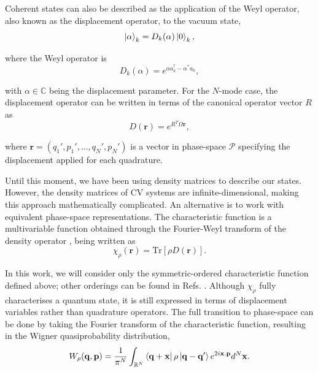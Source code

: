 \noindent Coherent states can also be described as the application of the Weyl operator, also known as the displacement operator, to the vacuum state,
\begin{equation}
    \ket{\alpha}_k = {D}_k (\alpha) \ket{0}_k,
\end{equation}

\noindent where the Weyl operator is
\begin{equation}
    {D}_k (\alpha) = e^{\alpha {a}_k^\dagger - \alpha^* {a}_k},
    \label{eq:displacement-single-mode}
\end{equation}

\noindent with $\alpha \in \mathbb{C}$ being the displacement parameter. For the $N$-mode case, the displacement operator can be written in terms of the canonical operator vector ${R}$ as
\begin{equation}
    {D}(\mathbf{r}) = e^{{R}^T \Omega \mathbf{r}},
\end{equation}

\noindent where $\mathbf{r} = (q_1', p_1', \dots, q_N', p_N')$ is a vector in phase-space $\mathcal{P}$ specifying the displacement applied for each quadrature.

Until this moment, we have been using density matrices to describe our states. However, the density matrices of CV systems are infinite-dimensional, making this approach mathematically complicated. An alternative is to work with equivalent phase-space representations. The characteristic function is a multivariable function obtained through the Fourier-Weyl transform of the density operator \cite{serafini-book}, being written as
\begin{equation}
    \chi_\rho (\mathbf{r}) = \text{Tr} [\rho {D}(\mathbf{r})].
\end{equation}

\noindent In this work, we will consider only the symmetric-ordered characteristic function defined above; other orderings can be found in Refs. \cite{gerardo-2014, serafini-book}. Although $\chi_\rho$ fully characterises a quantum state, it is still expressed in terms of displacement variables rather than quadrature operators. The full transition to phase-space can be done by taking the Fourier transform of the characteristic function, resulting in the Wigner quasiprobability distribution,
\begin{equation}
    W_\rho (\mathbf{q}, \mathbf{p}) = \frac{1}{\pi^N} \int_{\mathbb{R}^{N}} \bra{\mathbf{q} + \mathbf{x}} \rho \ket{\mathbf{q} - \mathbf{q'}} e^{2i \mathbf{x.p}} d^N \mathbf{x}.
\end{equation}

